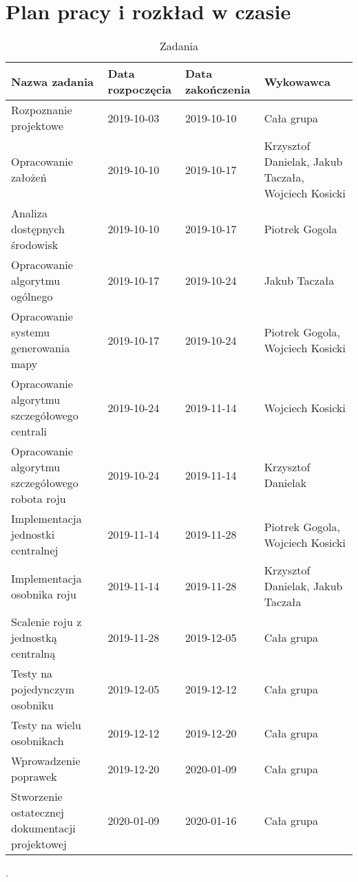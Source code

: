 \section{Plan pracy i rozkład w czasie}
\label{sec:plac_pracy_kamienie_milowe_i_rozklad_w_czasie} %
\begin{table}[h!]
\begin{center}
\begin{tabular}{|p{6cm}|p{2.2cm}|p{2.2cm}|p{3.2cm}|} %
\hline
Nazwa zadania & Data rozpoczęcia & Data zakończenia & Wykowawca \\ \hline
Rozpoznanie projektowe & 2019-10-03 & 2019-10-10 & Cała grupa\\ \hline
Opracowanie założeń & 2019-10-10 & 2019-10-17 & Krzysztof Danielak, Jakub Taczała, Wojciech Kosicki\\ \hline
Analiza dostępnych środowisk & 2019-10-10 & 2019-10-17 & Piotrek Gogola \\ \hline
Opracowanie algorytmu ogólnego & 2019-10-17 & 2019-10-24 & Jakub Taczała\\ \hline
Opracowanie systemu generowania mapy & 2019-10-17 & 2019-10-24 & Piotrek Gogola, Wojciech Kosicki\\ \hline
Opracowanie algorytmu szczegółowego centrali  & 2019-10-24 & 2019-11-14 & Wojciech Kosicki\\ \hline
Opracowanie algorytmu szczegółowego robota roju  & 2019-10-24 & 2019-11-14 & Krzysztof Danielak\\ \hline
Implementacja jednostki centralnej & 2019-11-14 & 2019-11-28 & Piotrek Gogola,  Wojciech Kosicki\\ \hline
Implementacja osobnika roju & 2019-11-14 & 2019-11-28 & Krzysztof Danielak, Jakub Taczała\\ \hline
Scalenie roju z jednostką centralną & 2019-11-28 & 2019-12-05 &  Cała grupa\\ \hline
Testy na pojedynczym osobniku & 2019-12-05 & 2019-12-12 &  Cała grupa\\ \hline
Testy na wielu osobnikach & 2019-12-12 & 2019-12-20 &  Cała grupa\\ \hline
Wprowadzenie poprawek & 2019-12-20 & 2020-01-09 &  Cała grupa\\ \hline
Stworzenie ostatecznej dokumentacji projektowej & 2020-01-09 & 2020-01-16 &  Cała grupa\\ \hline
\end{tabular}.
\end{center}
\caption{\label{rj}Zadania} %
\end{table}